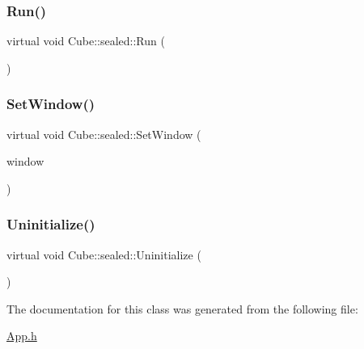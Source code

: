 \mbox{\label{class_cube_1_1sealed_a08467aa423e2a57ac7d9fd46f1b8e4ed}} 
\subsubsection{\texorpdfstring{Run()}{Run()}}
{\footnotesize\ttfamily virtual void Cube\+::sealed\+::\+Run (\begin{DoxyParamCaption}{ }\end{DoxyParamCaption})\hspace{0.3cm}{\ttfamily [virtual]}}

\mbox{\label{class_cube_1_1sealed_aa548d90b484cc7e465459cf6a0635c6e}} 
\subsubsection{\texorpdfstring{Set\+Window()}{SetWindow()}}
{\footnotesize\ttfamily virtual void Cube\+::sealed\+::\+Set\+Window (\begin{DoxyParamCaption}\item[{Windows\+::\+U\+I\+::\+Core\+::\+Core\+Window$^\wedge$}]{window }\end{DoxyParamCaption})\hspace{0.3cm}{\ttfamily [virtual]}}

\mbox{\label{class_cube_1_1sealed_ad8675c3ad9633b9220384db60c6c2d15}} 
\subsubsection{\texorpdfstring{Uninitialize()}{Uninitialize()}}
{\footnotesize\ttfamily virtual void Cube\+::sealed\+::\+Uninitialize (\begin{DoxyParamCaption}{ }\end{DoxyParamCaption})\hspace{0.3cm}{\ttfamily [virtual]}}



The documentation for this class was generated from the following file\+:\begin{DoxyCompactItemize}
\item 
\hyperlink{_app_8h}{App.\+h}\end{DoxyCompactItemize}
